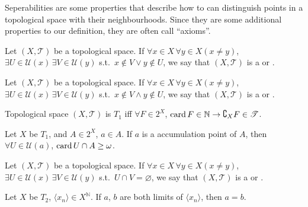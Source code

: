 \documentclass[openany]{book}
\begin{document}
Seperabilities are some properties that describe how to can distinguish points in a topological space with their neighbourhoods.
Since they are some additional properties to our definition, they are often call ``axioms''.

\begin{definition}%
	\label{def: T0}
	Let $(X, \mathscr T)$ be a topological space. 
	If $\forall x \in X \,\forall y \in X (x \neq y)$, $\exists U \in \mathscr U(x) \,\exists V \in \mathscr U(y)$ s.t.\ $x \notin V \vee y \notin U$, we say that $(X, \mathscr T)$ is a %
	or .
\end{definition}

\begin{definition}%
	\label{def: T1}
	Let $(X, \mathscr T)$ be a topological space. 
	If $\forall x \in X \,\forall y \in X (x \neq y)$, $\exists U \in \mathscr U(x) \,\exists V \in \mathscr U(y)$ s.t.\ $x \notin V \wedge y \notin U$, we say that $(X, \mathscr T)$ is a %
	or .
\end{definition}

\begin{theorem}%
	\label{theorem: finite subspaces are closed if T1}
	Topological space $(X, \mathscr T)$ is $T_1$ iff $\forall F \in 2^X$, $\operatorname{card} F \in \mathbb N \to \complement_X F \in \mathscr T$.
\end{theorem}

\begin{corollary}
	Let $X$ be $T_1$, and $A \in 2^X$, $a \in A$. 
	If $a$ is a accumulation point of $A$, then $\forall U \in \mathscr U(a)$, $\operatorname{card} U \cap A \geq \omega$.
\end{corollary}

\begin{definition}%
	\label{def: T2}
	Let $(X, \mathscr T)$ be a topological space. 
	If $\forall x \in X \,\forall y \in X (x \neq y)$, $\exists U \in \mathscr U(x) \,\exists V \in \mathscr U(y)$ s.t.\ $U \cap V = \varnothing$, we say that $(X, \mathscr T)$ is a %
	or .
\end{definition}

\begin{theorem}
	Let $X$ be $T_2$, $\langle x_n\rangle \in X^\mathbb N$. 
	If $a$, $b$ are both limits of  $\langle x_n\rangle$, then $a = b$.
\end{theorem}
\end{document}
